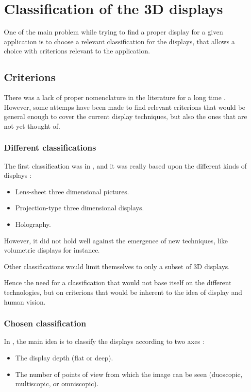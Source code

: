 \section{Classification of the 3D displays}
One of the main problem while trying to find a proper \gls{display} for a given application is to choose a relevant classification for the displays, that allows a choice with criterions relevant to the application.
\subsection{Criterions}
There was a lack of proper nomenclature in the literature for a long time \cite{pimenta2012comprehensive}. However, some attemps have been made to find relevant criterions that would be general enough to cover the current display techniques, but also the ones that are not yet thought of.

\subsubsection{Different classifications}
The first classification was in \cite{okoshi1976three}, and it was really based upon the different kinds of displays : 
\begin{itemize}
\item Lens-sheet three dimensional pictures.
\item Projection-type three dimensional displays.
\item Holography.
\end{itemize}

However, it did not hold well against the emergence of new techniques, like volumetric displays for instance.

Other classifications \cite{refnécessaire} would limit themselves to only a subset of 3D displays.

Hence the need for a classification that would not base itself on the different technologies, but on criterions that would be inherent to the idea of display and human vision.

\subsubsection{Chosen classification}
In \cite{pimenta2012comprehensive}, the main idea is to classify the displays according to two axes : 

\begin{itemize}
\item The display depth (flat or deep).
\item The number of points of view from which the image can be seen (duoscopic, multiscopic, or omniscopic).
\end{itemize}

